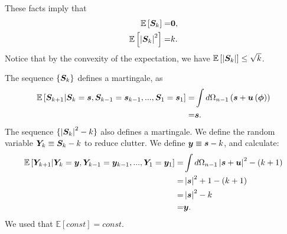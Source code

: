 These facts imply that
\begin{align}
    \mathbb{E}\left[{\bm S}_k\right]
    =&
    {\bm 0}
    ,\\
    \mathbb{E}\left[\left|{\bm S}_k\right|^2\right]
    =&
    k
    .
\end{align}
Notice that by the convexity of the expectation, we have $\mathbb{E}\left[\left|{\bm S}_k\right|\right]\leq \sqrt{k}$.

The sequence $\{{\bm S}_k\}$ defines a martingale, as
\begin{align}
    \mathbb{E}\left[{\bm S}_{k+1}|{\bm S}_{k}={\bm s},{\bm S}_{k-1}={\bm s}_{k-1},...,{\bm S}_1={\bm s}_1\right]
    =&
    \int d\Omega_{n-1} \left({\bm s} + {\bm u}\left({\bm \phi}\right)\right)
    \nonumber\\
    =&
    {\bm s}
    .
\end{align}
The sequence $\{\left|{\bm S}_{k}\right|^2 - k\}$ also defines a martingale.
We define the random variable ${\bm Y}_k \equiv {\bm S}_k - k$ to reduce clutter.
We define ${\bm y} \equiv {\bm s} - k$, and calculate:
\begin{align}
    \mathbb{E}\left[{\bm Y}_{k+1}|{\bm Y}_{k}={\bm y},{\bm Y}_{k-1}={\bm y}_{k-1},...,{\bm Y}_1={\bm y}_1\right]
    =&
    \int d\Omega_{n-1} \left|{\bm s} + {\bm u}\right|^2
    -
    \left(k+1\right)
    \nonumber\\
    =&
    \left|{\bm s}\right|^2
    +
    1
    -
    \left(k+1\right)
    \nonumber\\
    =&
    \left|{\bm s}\right|^2
    -
    k
    \nonumber\\
    =&
    {\bm y}
    .
\end{align}
We used that $\mathbb{E}\left[const\right]=const$.
